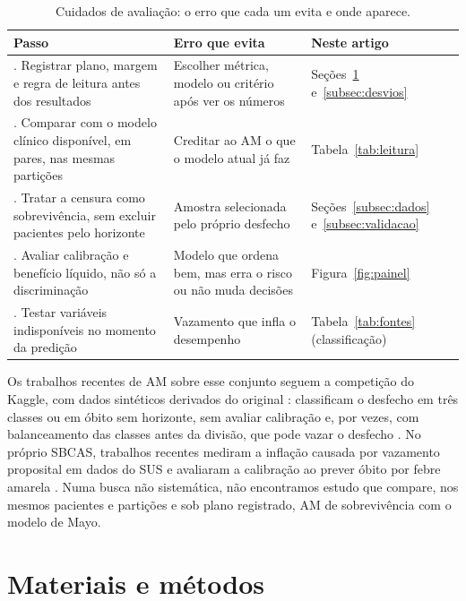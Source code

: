 \documentclass[12pt]{article}
\begin{document}
\begin{table}[!t]
\centering
\caption{Cuidados de avaliação: o erro que cada um evita e onde aparece.}
\label{tab:protocolo}
\footnotesize
\setlength{\tabcolsep}{4pt}
\begin{tabularx}{\textwidth}{@{}>{\raggedright\arraybackslash}p{6.6cm}>{\raggedright\arraybackslash}X>{\raggedright\arraybackslash}p{2.6cm}@{}}
\toprule
Passo & Erro que evita & Neste artigo \\
\midrule
1. Registrar plano, margem e regra de leitura antes dos resultados & Escolher métrica, modelo ou critério após ver os números & Seções~\ref{sec:metodos} e~\ref{subsec:desvios} \\
2. Comparar com o modelo clínico disponível, em pares, nas mesmas partições & Creditar ao AM o que o modelo atual já faz & Tabela~\ref{tab:leitura} \\
3. Tratar a censura como sobrevivência, sem excluir pacientes pelo horizonte & Amostra selecionada pelo próprio desfecho & Seções~\ref{subsec:dados} e~\ref{subsec:validacao} \\
4. Avaliar calibração e benefício líquido, não só a discriminação & Modelo que ordena bem, mas erra o risco ou não muda decisões & Figura~\ref{fig:painel} \\
5. Testar variáveis indisponíveis no momento da predição & Vazamento que infla o desempenho & Tabela~\ref{tab:fontes} (classificação) \\
\bottomrule
\end{tabularx}
\end{table}

Os trabalhos recentes de AM sobre esse conjunto seguem a competição do \mbox{Kaggle}, com dados sintéticos derivados do original \cite{reade2023ps3e26}: classificam o desfecho em três classes ou em óbito sem horizonte, sem avaliar calibração e, por vezes, com balanceamento das classes antes da divisão, que pode vazar o desfecho \cite{shakir2025cirrhosis,tu2025cirrhosis,kapoor2023leakage}. No próprio SBCAS, trabalhos recentes mediram a inflação causada por vazamento proposital em dados do SUS \cite{pereira2026responsible} e avaliaram a calibração ao prever óbito por febre amarela \cite{lodi2026febre}. Numa busca não sistemática, não encontramos estudo que compare, nos mesmos pacientes e partições e sob plano registrado, AM de sobrevivência com o modelo de Mayo.

\section{Materiais e métodos}\label{sec:metodos}
\end{document}
